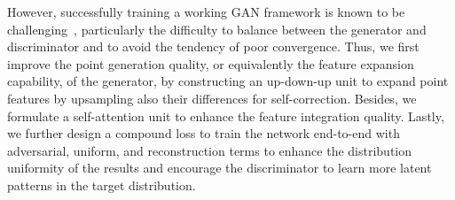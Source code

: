 

However, successfully training a working GAN framework is known to be challenging~\cite{goodfellow2014distinguishability,radford2015unsupervised}, particularly the difficulty to balance between the generator and discriminator and to avoid the tendency of poor convergence.
%
Thus, we first improve the point generation quality, or equivalently the feature expansion capability, of the generator, by constructing an up-down-up unit to expand point features by upsampling also their differences for self-correction.
Besides, we formulate a self-attention unit to enhance the feature integration quality.
Lastly, we further design a compound loss to train the network end-to-end with adversarial, uniform, and reconstruction terms to enhance the distribution uniformity of the results and encourage the discriminator to learn more latent patterns in the target distribution.


%

